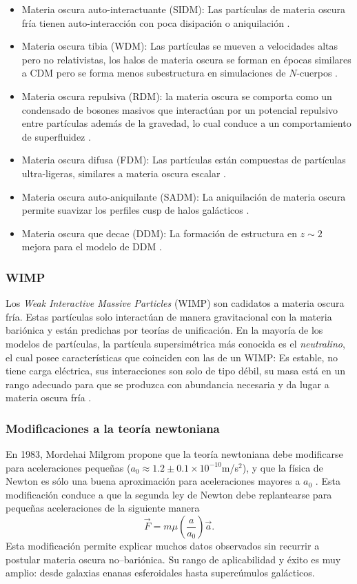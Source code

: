\documentclass[a4paper,openright,12pt]{book}
\begin{document}
\begin{itemize}
\item Materia oscura auto-interactuante (SIDM): Las partículas de materia oscura fría tienen auto-interacción con poca disipación o aniquilación \cite{1.3.1}.
\item Materia oscura tibia (WDM): Las partículas se mueven a velocidades altas pero no relativistas, los halos de materia oscura se forman en épocas similares a CDM pero se forma menos subestructura en simulaciones de $N$-cuerpos \cite{1.3.2}.
\item Materia oscura repulsiva (RDM): la materia oscura se comporta como un condensado de bosones masivos que interactúan por un potencial repulsivo entre partículas además de la gravedad, lo cual conduce a un comportamiento de superfluidez \cite{1.3.3}.
\item Materia oscura difusa (FDM): Las partículas están compuestas de partículas ultra-ligeras, similares a materia oscura escalar \cite{1.3.4}.
\item Materia oscura auto-aniquilante (SADM): La aniquilación de materia oscura permite suavizar los perfiles cusp de halos galácticos \cite{1.3.5}.
\item Materia oscura que decae (DDM):  La formación de estructura en $z \sim 2$ mejora para el modelo de DDM \cite{1.3.6}.
\end{itemize}


\subsubsection*{WIMP}
Los \textit{Weak Interactive Massive Particles} (WIMP) son cadidatos a materia oscura fría. Estas partículas solo interactúan de manera gravitacional con la materia bariónica y están predichas por teorías de unificación. En la mayoría de los modelos de partículas, la partícula supersimétrica más conocida es el \textit{neutralino}, el cual posee  características que coinciden con las de un WIMP: Es estable, no tiene carga eléctrica, sus interacciones son solo de tipo débil, su masa está en un rango adecuado para que se produzca con abundancia necesaria y da lugar a materia oscura fría \cite{1.3.7}.

\subsubsection*{Modificaciones a la teoría newtoniana}

En 1983, Mordehai Milgrom propone que la teoría newtoniana debe modificarse para aceleraciones pequeñas ($a_{0} \approx 1.2 \pm 0.1 \times 10^{-10}$m/s$^{2}$), y que la física de Newton es sólo una buena aproximación para aceleraciones mayores a $a_{0}$ \cite{1.3.8}. Esta modificación conduce a que la segunda ley de Newton debe replantearse para pequeñas aceleraciones de la siguiente manera 
\begin{equation}
\vec{F} = m \mu (\frac{a}{a_{0}})\vec{a}.\label{eqn 1.79}
\end{equation}
Esta modificación permite explicar muchos datos observados sin recurrir a postular materia oscura no--bariónica. Su rango de aplicabilidad y éxito es muy amplio: desde galaxias enanas esferoidales hasta supercúmulos galácticos.
\end{document}
